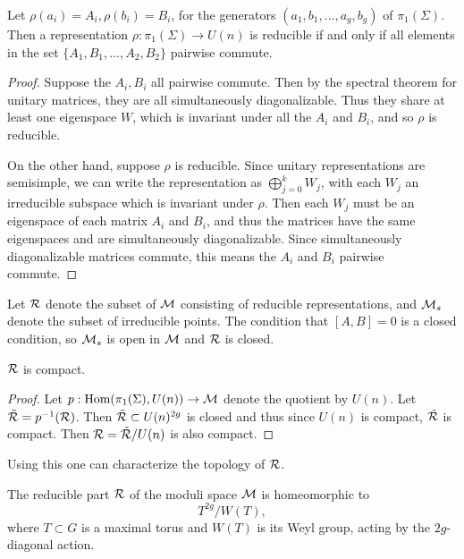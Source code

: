	\begin{lemma}
		\label{l:irrep-lemma}
		Let $\rho(a_i) = A_i, \rho(b_i) = B_i$, for the generators $(a_1,b_1,...,a_g,b_g)$ of $\pi_1(\Sigma)$. Then a representation $\rho:\pi_1(\Sigma) \to U(n)$ is reducible if and only if all elements in the set $\{A_1,B_1,...,A_2,B_2\}$ pairwise commute.
	\end{lemma}
	\begin{proof}
		Suppose the $A_i,B_i$ all pairwise commute. Then by the spectral theorem for unitary matrices, they are all simultaneously diagonalizable. Thus they share at least one eigenspace $W$, which is invariant under all the $A_i$ and $B_i$, and so $\rho$ is reducible.
		
		On the other hand, suppose $\rho$ is reducible. Since unitary representations are semisimple, we can write the representation as $\bigoplus_{j=0}^k W_j$, with each $W_j$ an irreducible subspace which is invariant under $\rho$. Then each $W_j$ must be an eigenspace of each matrix $A_i$ and $B_i$, and thus the matrices have the same eigenspaces and are simultaneously diagonalizable. Since simultaneously diagonalizable matrices commute, this means the $A_i$ and $B_i$ pairwise commute. 
	\end{proof}
	Let $\mathcal{R}$ denote the subset of $\mathcal{M}$ consisting of reducible representations, and $\mathcal{M}_s$ denote the subset of irreducible points. The condition that $[A,B] =0$ is a closed condition, so $\mathcal{M}_s$ is open in $\mathcal{M}$ and $\mathcal{R}$ is closed.
	\begin{lemma}
		$\mathcal{R}$ is compact.
	\end{lemma}
	\begin{proof}
		Let $p:\text{Hom}(\pi_1(\Sigma),U(n))\to \mathcal{M}$ denote the quotient by $U(n)$. Let $\tilde{\mathcal{R}} = p^{-1}(\mathcal{R})$. Then $\tilde{\mathcal{R}} \subset U(n)^{2g}$ is closed and thus since $U(n)$ is compact, $\tilde{\mathcal{R}}$ is compact. Then $\mathcal{R} = \tilde{\mathcal{R}}/U(n)$ is also compact.
	\end{proof}
	Using this one can characterize the topology of $\mathcal{R}$.
	\begin{theorem}
		\label{t:reducibletorus}
		The reducible part $\mathcal{R}$ of the moduli space $\mathcal{M}$ is homeomorphic to
		\begin{equation}
			T^{2g}/W(T),
		\end{equation}
		where $T\subset G$ is a maximal torus and $W(T)$ is its Weyl group, acting by the $2g$-diagonal action.
	\end{theorem}
